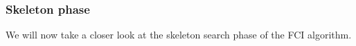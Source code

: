 \subsubsection{Skeleton phase}

We will now take a closer look at the skeleton search phase of the FCI algorithm.

